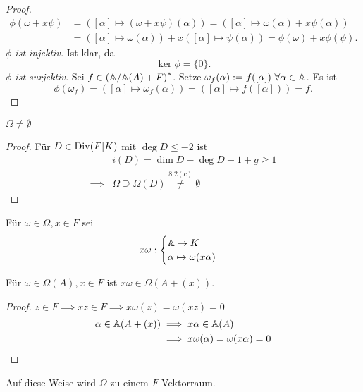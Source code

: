 \begin{proof}
\begin{align*}
        \phi(\omega + x \psi) & = \left([\alpha] \mapsto (\omega + x \psi)(\alpha)\right) = \left([\alpha] \mapsto \omega(\alpha) + x \psi(\alpha)\right)\\
            & =  \left([\alpha] \mapsto \omega(\alpha)\right) + x \left([\alpha] \mapsto \psi(\alpha)\right) = \phi(\omega) + x \phi(\psi).
    \end{align*}
    \emph{$\phi$ ist injektiv.} Ist klar, da 
    $$ \ker \phi = \{0\}. $$
    \emph{$\phi$ ist surjektiv.} Sei $f \in \left(\mathbb{A}/\mathbb{A}(A) + F\right)^*$. Setze $\omega_f(\alpha) := f([\alpha]) ~\forall \alpha \in \mathbb{A}$. Es ist
    $$ \phi(\omega_f) = \left([\alpha] \mapsto \omega_f(\alpha)\right) = \left([\alpha] \mapsto f([\alpha])\right) = f. $$
\end{proof}

\begin{lemma}
    $\Omega \ne \emptyset$
\end{lemma}
\begin{proof}
    Für $D\in\operatorname{Div}(F|K)$ mit $\deg D \leq - 2$ ist
    \begin{align*}
        &i(D) = \dim D - \deg D - 1 + g \geq 1\\
        \implies & \Omega \supseteq \Omega(D) \stackrel{8.2(c)}{\ne} \emptyset
    \end{align*} 
\end{proof}

\begin{definition}
    Für $\omega \in \Omega, x \in F$ sei 
    $$ x\omega: \begin{cases}
        \mathbb{A} \to K\\
        \alpha \mapsto \omega(x\alpha)
    \end{cases}$$
\end{definition}

\begin{lemma}
    Für $\omega\in\Omega(A), x \in F$ ist $x\omega\in \Omega(A+(x))$.
\end{lemma}
\begin{proof}
    $z \in F \implies xz \in F \implies x\omega(z)=\omega(xz)=0$
    \begin{align*}
        \alpha \in \mathbb{A}(A+(x)) &\implies x\alpha \in \mathbb{A}(A)\\
        &\implies x\omega(\alpha) = \omega(x\alpha) = 0
    \end{align*}
\end{proof}

\begin{bemerkungnr}
    Auf diese Weise wird $\Omega$ zu einem $F$-Vektorraum.
\end{bemerkungnr}

